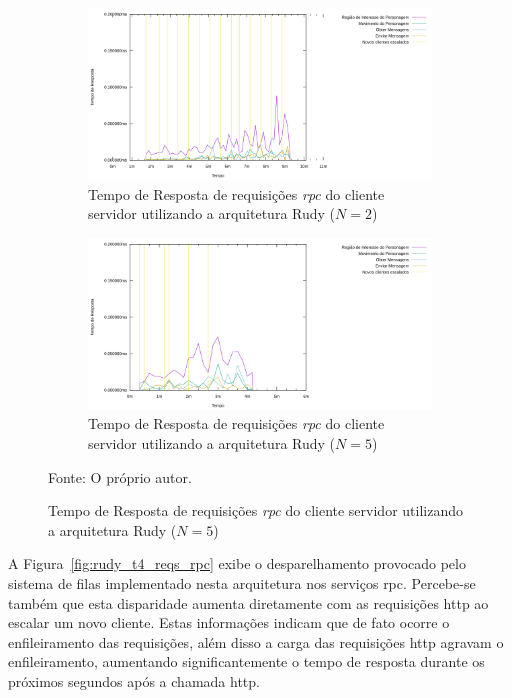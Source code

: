 \begin{figure}[htb!]
    \caption{Tempo de Resposta de requisições \textit{rpc} do cliente servidor utilizando a arquitetura Rudy ($N=2$ e $N=5$)}
    \centering
    \begin{subfigure}{1.0\textwidth}
      \centering
      \includegraphics[width=.9\textwidth]{metricas_rudy_t5/rudyc_rpc.png}
      \caption{Tempo de Resposta de requisições \textit{rpc} do cliente servidor utilizando a arquitetura Rudy ($N=2$)}
      \label{fig:rudy_t5_reqs_rpc}
    \end{subfigure}


    \begin{subfigure}{1.0\textwidth}
      \centering
      \includegraphics[width=.9\textwidth]{metricas_rudy_t6/rudyc_rpc.png}
      \caption{Tempo de Resposta de requisições \textit{rpc} do cliente servidor utilizando a arquitetura Rudy ($N=5$)}
      \label{fig:rudy_t6_reqs_rpc}
    \end{subfigure}
    \label{fig:rudy_t56_reqs_rpc}

    Fonte: O próprio autor.
\end{figure}

A Figura~\ref{fig:rudy_t4_reqs_rpc} exibe o desparelhamento provocado pelo sistema de filas implementado nesta arquitetura nos serviços \ac{rpc}.
%
Percebe-se também que esta disparidade aumenta diretamente com as requisições \ac{http} ao escalar um novo cliente.
%
Estas informações indicam que de fato ocorre o enfileiramento das requisições, além disso a carga das requisições \ac{http} agravam o enfileiramento, aumentando significantemente o tempo de resposta durante os próximos segundos após a chamada \ac{http}.

